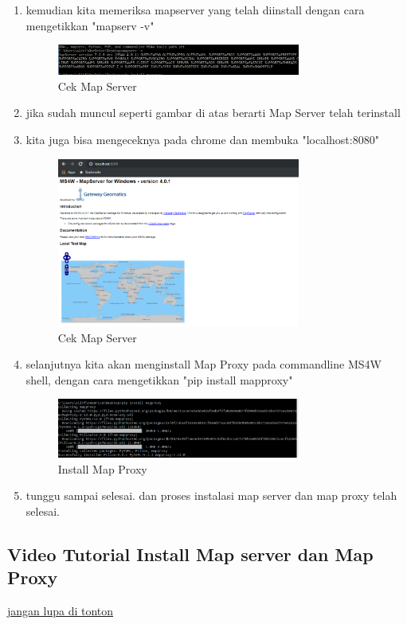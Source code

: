 \begin{enumerate}
	\item kemudian kita memeriksa mapserver yang telah diinstall dengan cara mengetikkan "mapserv -v"
    \hfill\break
	\begin{figure}[H]
		\includegraphics[width=8cm]{figures/1174057/Tugas4enam.PNG}
		\centering
		\caption{Cek Map Server}
	\end{figure}

	\item jika sudah muncul seperti gambar di atas berarti Map Server telah terinstall

	\item kita juga bisa mengeceknya pada chrome dan membuka "localhost:8080"
	\begin{figure}[H]
		\includegraphics[width=8cm]{figures/1174057/Tugas4tujuh.PNG}
		\centering
		\caption{Cek Map Server}
	\end{figure}

	\item selanjutnya kita akan menginstall Map Proxy pada commandline MS4W shell, dengan cara mengetikkan "pip install mapproxy"
	\begin{figure}[H]
		\includegraphics[width=8cm]{figures/1174057/Tugas4lapan.PNG}
		\centering
		\caption{Install Map Proxy}
	\end{figure}

	\item tunggu sampai selesai. dan proses instalasi map server dan map proxy telah selesai.
\end{enumerate}

\subsection{Video Tutorial Install Map server dan Map Proxy}
\href{https://www.youtube.com/watch?v=-cprZtvh7yU&feature=youtu.be}{jangan lupa di tonton}
